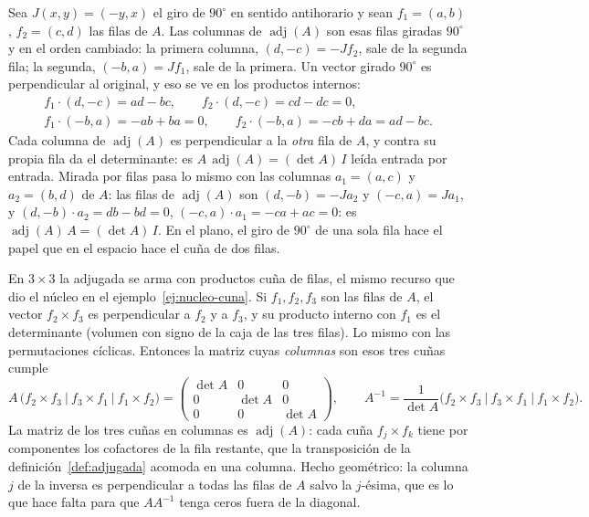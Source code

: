 \begin{idea}
Sea \(J(x,y)=(-y,x)\) el giro de \(90^\circ\) en sentido antihorario y sean \(f_1=(a,b)\),
\(f_2=(c,d)\) las filas de \(A\). Las columnas de \(\operatorname{adj}(A)\) son esas filas
giradas \(90^\circ\) y en el orden cambiado: la primera columna, \((d,-c)=-Jf_2\), sale de la
segunda fila; la segunda, \((-b,a)=Jf_1\), sale de la primera. Un vector girado \(90^\circ\) es
perpendicular al original, y eso se ve en los productos internos:
\[
  \begin{gathered}
  f_1\cdot(d,-c)=ad-bc,\qquad f_2\cdot(d,-c)=cd-dc=0,\\
  f_1\cdot(-b,a)=-ab+ba=0,\qquad f_2\cdot(-b,a)=-cb+da=ad-bc .
  \end{gathered}
\]
Cada columna de \(\operatorname{adj}(A)\) es perpendicular a la \emph{otra} fila de \(A\), y
contra su propia fila da el determinante: es \(A\,\operatorname{adj}(A)=(\det A)\,I\) leída
entrada por entrada. Mirada por filas pasa lo mismo con las columnas \(a_1=(a,c)\) y
\(a_2=(b,d)\) de \(A\): las filas de \(\operatorname{adj}(A)\) son \((d,-b)=-Ja_2\) y
\((-c,a)=Ja_1\), y \((d,-b)\cdot a_2=db-bd=0\), \((-c,a)\cdot a_1=-ca+ac=0\): es
\(\operatorname{adj}(A)\,A=(\det A)\,I\). En el plano, el giro de \(90^\circ\) de una sola
fila hace el papel que en el espacio hace el cuña de dos filas.
\end{idea}

En \(3\times3\) la adjugada se arma con productos cuña de filas, el mismo recurso que dio el
núcleo en el ejemplo~\ref{ej:nucleo-cuna}. Si \(f_1,f_2,f_3\) son las filas de \(A\), el
vector \(f_2\times f_3\) es perpendicular a \(f_2\) y a \(f_3\), y su producto interno con
\(f_1\) es el determinante (volumen con signo de la caja de las tres filas). Lo mismo con
las permutaciones cíclicas. Entonces la matriz cuyas \emph{columnas} son esos tres cuñas
cumple
\[
  A\,\bigl(f_2\times f_3\ \big|\ f_3\times f_1\ \big|\ f_1\times f_2\bigr)
  =\begin{pmatrix}\det A&0&0\\0&\det A&0\\0&0&\det A\end{pmatrix},
  \qquad
  A^{-1}=\frac1{\det A}\bigl(f_2\times f_3\ \big|\ f_3\times f_1\ \big|\ f_1\times f_2\bigr).
\]
La matriz de los tres cuñas en columnas es \(\operatorname{adj}(A)\): cada cuña
\(f_j\times f_k\) tiene por componentes los cofactores de la fila restante, que la
transposición de la definición~\ref{def:adjugada} acomoda en una columna.
Hecho geométrico: la columna \(j\) de la inversa es perpendicular a todas las filas de
\(A\) salvo la \(j\)-ésima, que es lo que hace falta para que \(AA^{-1}\) tenga
ceros fuera de la diagonal.

